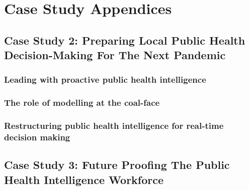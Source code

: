 \documentclass{tufte-book}
\begin{document}
\cleardoublepage
\mainmatter







\part*{Case Study Appendices}
\appendix



\chapter{Case Study 2: Preparing Local Public Health Decision-Making For The Next Pandemic}
\section{Leading with proactive public health intelligence}
\section{The role of modelling at the coal-face}
\section{Restructuring public health intelligence for real-time decision making}

\chapter{Case Study 3: Future Proofing The Public Health Intelligence Workforce} \label{ch:case_study_3}




\backmatter


\printindex
\end{document}
